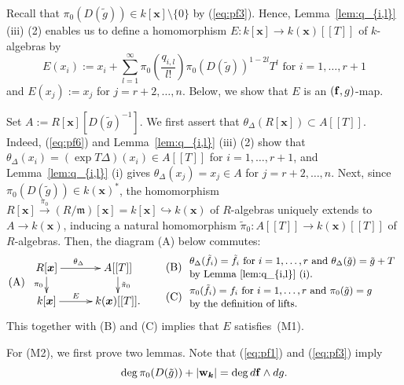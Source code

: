 \documentclass{amsart}
\theoremstyle{plain}
\theoremstyle{definition}
\newcommand{\fm }{{\mathfrak{m}}}
\newcommand{\zs}{\{ 0\} }
\newcommand{\sm}{\setminus}
\newcommand{\nd}{\noindent}
\newcommand{\x}{{\boldsymbol x}}
\newcommand{\w}{{\bf w}}
\newcommand{\bk}{{\boldsymbol k}}
\newcommand{\ff}{{\bf f}}
\newcommand{\kx}{k[\x]}
\newcommand{\kxr}{k(\x)}
\newcommand{\Rx}{R[\x]}
\newcommand{\degw  }{\deg}
\begin{document}
\nd {\bf Step 3. $(\ff ,g)$-map.} 
Recall that 
$\pi _0(D(\tilde{g}))\in \kx \sm \zs $ by (\ref{eq:pf3}). Hence, 
Lemma~\ref{lem:q_{i,l}} (iii) (2) 
enables us to define 
a homomorphism $E:\kx \to \kxr [[T]]$ of $k$-algebras by 
\begin{equation}\label{eq:pf7}
E(x_i):=x_i+\sum _{l=1}^\infty 
\pi _0\left(\dfrac{q_{i,l}}{l!}\right)
\pi _0(D(\tilde{g}))^{1-2l}T^l
\text{ \ \ for \ \ }i=1,\ldots ,r+1 
\end{equation}
and $E(x_j):=x_j$ for $j=r+2,\ldots ,n$. 
Below, 
we show that $E$ is an $(\ff ,g)$-map. 



Set $A:=\Rx [D(\tilde{g})^{-1}]$. 
We first assert that $\theta _\Delta (\Rx )\subset A[[T]]$. 
Indeed, 
(\ref{eq:pf6}) and Lemma~\ref{lem:q_{i,l}} (iii) (2) show that 
$\theta _{\Delta }(x_i)=(\exp T\Delta )(x_i)\in A[[T]]$ 
for $i=1,\ldots ,r+1$, 
and Lemma~\ref{lem:q_{i,l}} (i) gives 
$\theta _{\Delta }(x_j)=x_j\in A$ for $j=r+2,\ldots ,n$. 
Next, since $\pi _0(D(\tilde{g}))\in \kxr ^*$, 
the homomorphism 
$\Rx \stackrel{\pi _0}{\to }(R/\fm )[\x ]=\kx \hookrightarrow \kxr $ 
of $R$-algebras uniquely extends to $A\to \kxr $, 
inducing a natural homomorphism 
$\tilde{\pi }_0:A[[T]]\to \kxr [[T]]$ of $R$-algebras. 
Then, 
the diagram (A) below commutes: 
$$
{\rm (A)}\begin{array}{l}
\xymatrix@C=10mm@R=5mm
{
\Rx  \ar[d]_{\pi _0} \ar[r]^(.45){\theta _\Delta } 
& A[[T]]
 \ar[d]^{\tilde{\pi }_0} \\ 
\kx  \ar[r]^(.41){E} 
& \kxr [[T]].}
\end{array}
\quad 
\begin{array}{ll}
\multirow{2}{*}{\text{(B)}} \!\!& 
\text{\small $\theta _\Delta (\tilde{f}_i)=\tilde{f}_i$ for $i=1,\ldots ,r$ 
and $\theta _\Delta (\tilde{g})=\tilde{g}+T$} \\ 
\smallskip 
 & \text{\small by Lemma~\ref{lem:q_{i,l}}~(i).} \\ 
\multirow{2}{*}{\text{(C)}} \!\!& \small \text{$\pi _0(\tilde{f}_i)=f_i$ for $i=1,\ldots ,r$ and $\pi _0(\tilde{g})=g$ }\\
& \text{\small by the definition of lifts.}
\end{array}
$$
This together with (B) and (C) implies that $E$ satisfies~(M1). 


For (M2), we first prove two lemmas. 
Note that (\ref{eq:pf1}) and (\ref{eq:pf3}) imply 
\begin{equation}\label{eq:pf1'}
\degw \pi _0(D(\tilde{g}))+|\w _{\bk }|=\deg d\ff \wedge dg. 
\end{equation}
\end{document}
